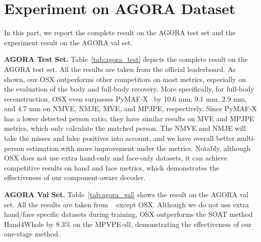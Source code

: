 \documentclass[10pt,twocolumn,letterpaper]{article}
\begin{document}
\section{Experiment on AGORA Dataset}
\label{sec:agora}
In this part, we report the complete result on the AGORA test set and the experiment result on the AGORA val set.

\noindent\textbf{AGORA Test Set.} Table~\ref{tab:agora_test} depicts the complete result on the AGORA test set. All the results are taken from the official leaderboard. As shown, our OSX outperforms other competitors on most metrics, especially on the evaluation of the body and full-body recovery. More specifically, for full-body reconstruction, OSX even surpasses PyMAF-X~\cite{HongwenZhang2022PyMAFXTW} by 10.6 mm, 9.1 mm, 2.9 mm, and 4.7 mm on NMVE, NMJE, MVE, and MPJPE, respectively. Since PyMAF-X has a lower detected person ratio, they have similar results on MVE and MPJPE metrics, which only calculate the matched person. The NMVE and NMJE will take the misses and false positives into account, and we have overall better multi-person estimation with more improvement under the metrics.
Notably, although OSX does not use extra hand-only and face-only datasets, it can achieve competitive results on hand and face metrics, which demonstrates the effectiveness of our component-aware decoder.

\noindent\textbf{AGORA Val Set.} Table~\ref{tab:agora_val} shows the result on the AGORA val set. All the results are taken from ~\cite{GyeongsikMoon2020hand4whole} except OSX. Although we do not use extra hand/face specific datasets during training, OSX outperforms the SOAT method Hand4Whole by 8.3\% on the MPVPE-all, demonstrating the effectiveness of our one-stage method. 
\end{document}
